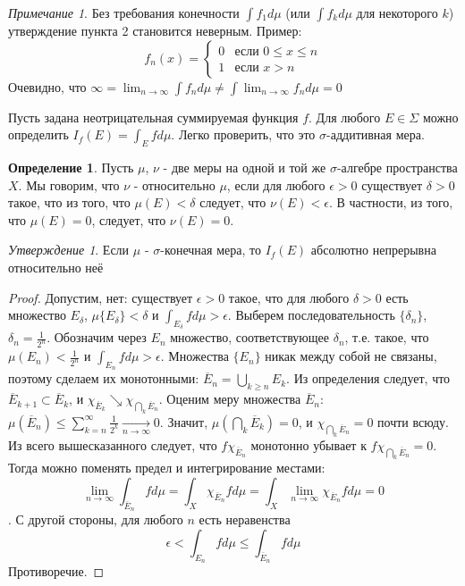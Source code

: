 \documentclass[a4paper]{article}
\theoremstyle{indented}
\theoremstyle{definition}
\newtheorem{defn}{Определение}
\theoremstyle{remark}
\newtheorem{remark}{Примечание}
\newtheorem{stat}{Утверждение}
\DeclareMathOperator{\ra}{\rightarrow}
\begin{document}
\begin{remark}
Без требования конечности $\int f_1 d \mu$ (или $\int f_k d \mu$ для некоторого $k$) утверждение пункта 2 становится неверным. Пример: $$f_n(x) = \begin{cases} 0 &\mbox{если } 0 \leq x \leq n \\ 
1 & \mbox{если } x>n \end{cases}$$ Очевидно, что $\infty = \lim_{n \ra \infty} \int f_n d \mu \neq \int \lim_{n \ra \infty} f_n d \mu = 0$
\end{remark}
Пусть задана неотрицательная суммируемая функция $f$. Для любого $E \in \Sigma$
можно определить $I_f(E) = \int_E f d \mu$. Легко проверить, что это $\sigma$-аддитивная мера.
\\
\begin{defn}
Пусть $\mu$, $\nu$ - две меры на одной и той же $\sigma$-алгебре пространства $X$. Мы говорим, что $\nu$ -  относительно $\mu$, если для любого $\epsilon > 0$ существует $\delta > 0$ такое, что из того, что $\mu(E)< \delta$ следует, что $\nu(E)<\epsilon$. В частности, из того, что $\mu(E)=0$, следует, что $\nu(E)=0$.
\end{defn}
\begin{stat}
Если $\mu$ -  $\sigma$-конечная мера, то $I_f(E)$ абсолютно непрерывна относительно неё
\end{stat}
\begin{proof}
Допустим, нет: существует $\epsilon>0$ такое, что для любого $\delta > 0$ есть множество $E_{\delta}$, $\mu\{E_{\delta}\}< \delta$ и $\int_{E_{\delta}} f d \mu > \epsilon$. Выберем последовательность $\{\delta_n\}$, $\delta_n = \frac{1}{2^n}$. Обозначим через $E_n$ множество, соответствующее $\delta_n$, т.е. такое, что $\mu(E_n)<\frac{1}{2^n}$ и $\int_{E_n} f d \mu > \epsilon$. Множества $\{E_n\}$ никак между собой не связаны, поэтому сделаем их монотонными: $\overline{E}_n = \bigcup_{k \geq n} E_k$. Из определения следует, что $\overline{E}_{k+1} \subset \overline{E}_k$, и $\chi_{\overline{E}_k} \searrow \chi_{\bigcap_k \overline{E}_n}$. Оценим меру множества $\overline{E}_n$:  $\mu(\overline{E}_n) \leq \sum_{k=n}^{\infty} \frac{1}{2^k} \underset{n \ra \infty}{\longrightarrow} 0$. Значит, $\mu(\bigcap_k \overline{E}_k) = 0$, и $\chi_{\bigcap_k \overline{E}_n} = 0$ почти всюду. Из всего вышесказанного следует, что $f \chi_{\overline{E}_n}$ монотонно убывает к $f \chi_{\bigcap_k \overline{E}_n} = 0$. Тогда можно поменять предел и интегрирование местами: $$\lim_{n \ra \infty} \int_{\overline{E}_n} f d \mu = \int_X \chi_{\overline{E}_n}f d \mu = \int_X \lim_{n \ra \infty} \chi_{\overline{E}_n}f d \mu = 0$$. С другой стороны, для любого $n$ есть неравенства $$\epsilon < \int_{E_n} f d \mu \leq \int_{\overline{E}_n} f d \mu$$
Противоречие.
\end{proof}
\end{document}
